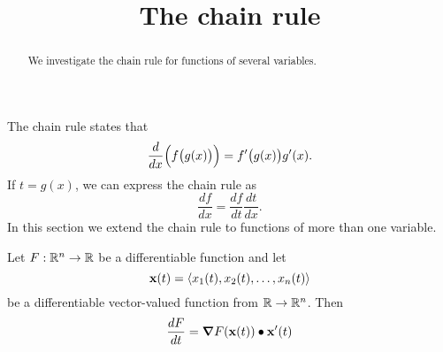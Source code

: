 \documentclass{ximera}
\title[Dig-In:]{The chain rule}
\begin{document}
\begin{abstract}
  We investigate the chain rule for functions of several variables.
\end{abstract}
\maketitle

The chain rule states that
\[
\ddx\Big(f\big(g(x)\big)\Big) = f'\big(g(x)\big)g'(x).
\]
If $t=g(x)$, we can express the chain rule as
\[
\frac{df}{dx} = \frac{df}{dt}\frac{dt}{dx}.
\]
In this section we extend the chain rule to functions of more than one
variable.

\begin{theorem}
  Let $F:\R^n\to\R$ be a differentiable function and let
  \[
  \vec{x}(t) = \vector{x_1(t),x_2(t),\dots,x_n(t)}
  \]
  be a differentiable vector-valued function from $\R\to\R^n$. Then
  \[
  \dd[F]{t} = \grad F(\vec{x}(t)) \dotp \vec{x}'(t) 
  \]
\end{theorem}
\end{document}
